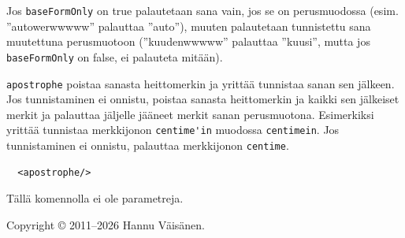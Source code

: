 \documentclass[12pt]{article}
\begin{document}
Jos \verb=baseFormOnly= on true palautetaan sana vain, jos se on
perusmuodossa (esim. ''autowerwwwww'' palauttaa ''auto''), muuten
palautetaan tunnistettu sana muutettuna perusmuotoon (''kuudenwwwww''
palauttaa ''kuusi'', mutta jos \verb=baseFormOnly= on false, ei
palauteta mitään).




\bigskip

\verb=apostrophe= poistaa sanasta heittomerkin ja yrittää tunnistaa
sanan sen jälkeen. Jos tunnistaminen ei onnistu, poistaa sanasta
heittomerkin ja kaikki sen jälkeiset merkit ja palauttaa jäljelle
jääneet merkit sanan perusmuotona. Esimerkiksi yrittää tunnistaa
merkkijonon \verb=centime'in= muodossa \verb=centimein=. Jos
tunnistaminen ei onnistu, palauttaa merkkijonon \verb=centime=.


\begin{verbatim}
  <apostrophe/>
\end{verbatim}

Tällä komennolla ei ole parametreja.


\bigskip \noindent
Copyright © 2011--2026 Hannu Väisänen.
\end{document}
